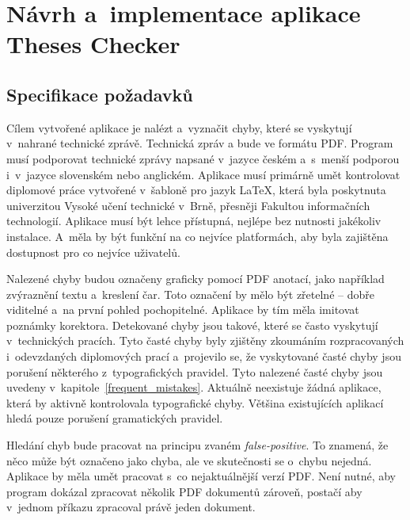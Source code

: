 



\chapter{Návrh a~implementace aplikace Theses Checker} \label{design_implementation}


\section{Specifikace požadavků}
Cílem vytvořené aplikace je nalézt a~vyznačit chyby, které se vyskytují
v~nahrané technické zprávě. Technická zpráv a bude ve formátu PDF.
Program musí podporovat technické zprávy napsané v~jazyce českém a~s~menší
podporou i~v~jazyce slovenském nebo anglickém. Aplikace musí primárně umět
kontrolovat diplomové práce vytvořené v~šabloně pro jazyk {\LaTeX}, která byla
poskytnuta univerzitou Vysoké učení technické v~Brně, přesněji Fakultou
informačních technologií. Aplikace musí
být lehce přístupná, nejlépe bez nutnosti jakékoliv instalace.
A~měla by být funkční na co nejvíce platformách, aby byla zajištěna dostupnost pro
co nejvíce uživatelů.

Nalezené
chyby budou označeny graficky pomocí PDF anotací, jako například zvýraznění textu
a~kreslení čar. Toto označení by mělo být zřetelné -- dobře viditelné
a~na první pohled pochopitelné. Aplikace by tím měla imitovat poznámky korektora.
Detekované chyby jsou takové, které se často vyskytují v~technických pracích.
Tyto časté chyby byly zjištěny zkoumáním rozpracovaných i~odevzdaných
diplomových prací a~projevilo se, že vyskytované časté chyby jsou porušení
některého z~typografických pravidel. Tyto nalezené časté chyby jsou uvedeny
v~kapitole~\ref{frequent_mistakes}. 
Aktuálně neexistuje žádná aplikace, která by aktivně kontrolovala typografické
chyby. Většina existujících aplikací hledá pouze porušení gramatických pravidel.

Hledání chyb bude pracovat na principu zvaném \emph{false-positive}. To znamená,
že něco může být označeno jako chyba, ale ve skutečnosti se o~chybu nejedná.
Aplikace by měla umět pracovat s~co nejaktuálnější verzí PDF. Není nutné, aby
program dokázal zpracovat několik PDF dokumentů zároveň, postačí aby v~jednom příkazu
zpracoval právě jeden dokument.



